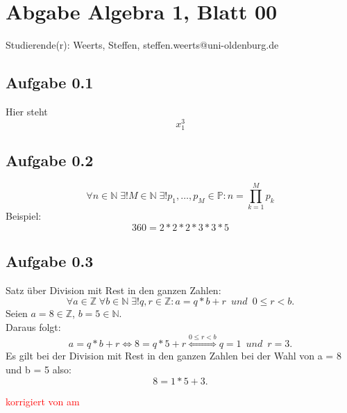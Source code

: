 \documentclass[12pt]{article}
\newcommand{\corr}[1]{\textcolor{red}{#1}}%
\begin{document}
\section*{Abgabe Algebra 1, Blatt 00}

Studierende(r): Weerts, Steffen, steffen.weerts@uni-oldenburg.de %

\subsection*{Aufgabe 0.1}
Hier steht $$x_1^3$$

\subsection*{Aufgabe 0.2}
$$\forall n \in \mathbb{N} \; \exists! M \in \mathbb{N} \; \exists! p_1, \ldots, p_M \in \mathbb{P}: n=\prod_{k=1}^{M}p_k$$
Beispiel:
$$360 = 2*2*2*3*3*5$$ 

\subsection*{Aufgabe 0.3}
Satz \"uber Division mit Rest in den ganzen Zahlen:
$$\forall a \in \mathbb{Z} \; \forall b \in \mathbb{N} \; \exists! q, r \in \mathbb{Z}: a=q*b+r \enspace und \enspace 0 \le r < b .$$
Seien $a = 8 \in \mathbb{Z}$, $b = 5 \in \mathbb{N}$.
\\ Daraus folgt: $$a = q*b+r \Longleftrightarrow 8 = q*5+r \overset{0 \leq r < b}{\Longleftrightarrow} q=1 \enspace und \enspace r = 3.$$
Es gilt bei der Division mit Rest in den ganzen Zahlen bei der Wahl von a = 8 und b = 5 also: $$8 = 1*5+3.$$


\bigskip

\corr{korrigiert von \hspace{1cm} am }
\end{document}

